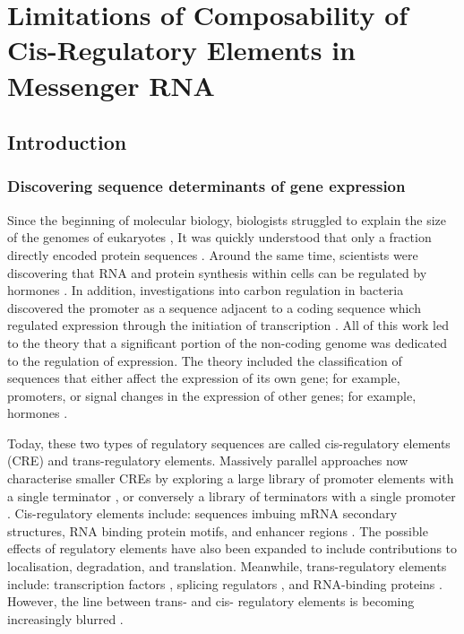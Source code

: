 \documentclass[../main.tex]{subfiles}
\begin{document}
\chapter{{Limitations} of Composability of Cis-Regulatory Elements in Messenger RNA}

\section{Introduction}

\subsection{Discovering sequence determinants of gene expression}

Since the beginning of molecular biology, biologists struggled to explain the size of the genomes of eukaryotes \parencite{MIRSKY1951},
It was quickly understood that only a fraction directly encoded protein sequences \parencite{Thomas1971}. 
Around the same time, scientists were discovering that RNA and protein synthesis within cells can be regulated by hormones \parencite{Ui1963}.
In addition, investigations into carbon regulation in bacteria discovered the promoter as a sequence adjacent to a coding sequence which regulated expression through the initiation of transcription \parencite{JACOB1964}.
All of this work led to the theory that a significant portion of the non-coding genome was dedicated to the regulation of expression. 
The theory included the classification of sequences that either affect the expression of its own gene; for example, promoters, or signal changes in the expression of other genes; for example, hormones \parencite{Britten1969}. 

Today, these two types of regulatory sequences are called cis-regulatory elements (CRE) and trans-regulatory elements.
Massively parallel approaches now characterise smaller CREs by exploring a large library of promoter elements with a single terminator \parencite{Sharon2012}, or conversely a library of terminators with a single promoter \parencite{Shalem2015}.
Cis-regulatory elements include: sequences imbuing mRNA secondary structures, RNA binding protein motifs, and enhancer regions \parencite{Li2015}. 
The possible effects of regulatory elements have also been expanded to include contributions to localisation, degradation, and translation.
Meanwhile, trans-regulatory elements include: transcription factors \parencite{Spitz2012}, splicing regulators \parencite{Will2011}, and RNA-binding proteins \parencite{Bleichert2010}.
However, the line between trans- and cis- regulatory elements is becoming increasingly blurred \parencite{Savarese2006}.
\end{document}
